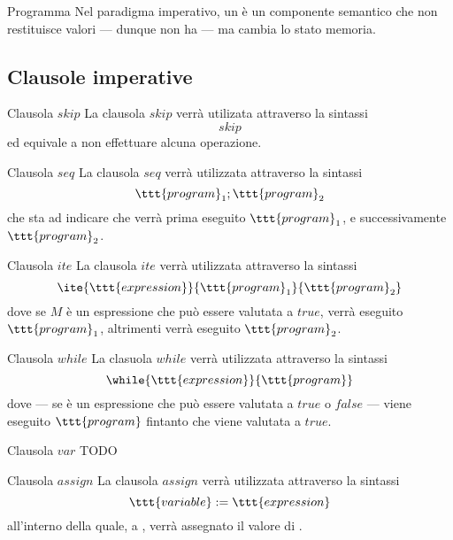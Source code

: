 \documentclass[a4paper, 12pt]{report}
\begin{document}
    \begin{frameddefn}{Programma}
        Nel paradigma imperativo, un  è un componente semantico che non restituisce valori --- dunque non ha  --- ma cambia lo stato memoria.
    \end{frameddefn}

    \subsection{Clausole imperative}

    \begin{frameddefn}{Clausola $skip$}
        La clausola $skip$ verrà utilizata attraverso la sintassi $$skip$$ ed equivale a non effettuare alcuna operazione.
    \end{frameddefn}
    
    \begin{frameddefn}{Clausola $seq$}
        La clausola $seq$ verrà utilizzata attraverso la sintassi $$\ttt{program}_1;\ttt{program}_2$$ che sta ad indicare che verrà prima eseguito $\ttt{program}_1$, e successivamente $\ttt{program}_2$.
    \end{frameddefn}

    \begin{frameddefn}{Clausola $ite$}
        La clausola $ite$ verrà utilizzata attraverso la sintassi $$\ite{\ttt{expression}}{\ttt{program}_1}{\ttt{program}_2}$$ dove se $M$ è un espressione che può essere valutata a $true$, verrà eseguito $\ttt{program}_1$, altrimenti verrà eseguito $\ttt{program}_2$.
    \end{frameddefn}

    \begin{frameddefn}{Clausola $while$}
        La clasuola $while$ verrà utilizzata attraverso la sintassi $$\while{\ttt{expression}}{\ttt{program}}$$ dove --- se  è un espressione che può essere valutata a $true$ o $false$ --- viene eseguito $\ttt{program}$ fintanto che  viene valutata a $true$.
    \end{frameddefn}

    \begin{frameddefn}{Clausola $var$}
        TODO
    \end{frameddefn}

    \begin{frameddefn}{Clausola $assign$}
        La clausola $assign$ verrà utilizzata attraverso la sintassi $$\ttt{variable}  := \ttt{expression}$$ all'interno della quale, a , verrà assegnato il valore di .
    \end{frameddefn}
\end{document}
